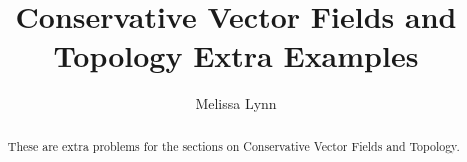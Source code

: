 \documentclass{ximera}
\title{Conservative Vector Fields and Topology Extra Examples}
\author{Melissa Lynn}
\begin{document}
  
\begin{abstract}  
These are extra problems for the sections on Conservative Vector Fields and Topology.
\end{abstract}  
\maketitle
\end{document}
